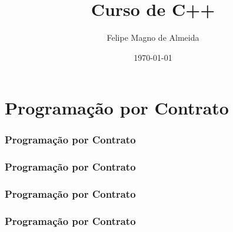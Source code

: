 \documentclass[14pt]{beamer}
\title{Curso de C++}
\author{Felipe Magno de Almeida}
\date{\today}
\begin{document}
\frame
{
  \titlepage
}

\frame
{
  \tableofcontents
}

\section{Programação por Contrato}

\newsavebox{\listingboxa}
\begin{lrbox}{\listingboxa}

\end{lrbox}

\frame
{
  \frametitle{Programação por Contrato}

  \usebox{\listingboxa}
}

\newsavebox{\listingboxb}
\begin{lrbox}{\listingboxb}

\end{lrbox}

\frame
{
  \frametitle{Programação por Contrato}

  \usebox{\listingboxb}
}

\newsavebox{\listingboxc}
\begin{lrbox}{\listingboxc}

\end{lrbox}

\frame
{
  \frametitle{Programação por Contrato}

  \usebox{\listingboxc}
}

\newsavebox{\listingboxd}
\begin{lrbox}{\listingboxd}

\end{lrbox}

\frame
{
  \frametitle{Programação por Contrato}

  \usebox{\listingboxd}
}
\end{document}
